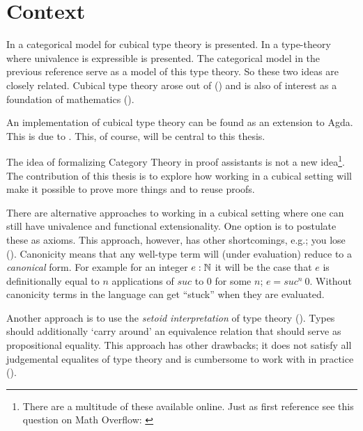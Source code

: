 \documentclass{article}
\begin{document}
\section{Context}
%
In \cite{bezem-2014} a categorical model for cubical type theory is presented.
In \cite{cohen-2016} a type-theory where univalence is expressible is presented.
The categorical model in the previous reference serve as a model of this type
theory. So these two ideas are closely related. Cubical type theory arose out of
 (\cite{hott-2013}) and is also of interest as a
foundation of mathematics (\cite{voevodsky-2011}).

An implementation of cubical type theory can be found as an extension to Agda.
This is due to \citeauthor{cubical-agda}. This, of course, will be central to
this thesis.

The idea of formalizing Category Theory in proof assistants is not a new
idea\footnote{There are a multitude of these available online. Just as first
reference see this question on Math Overflow: \cite{mo-formalizations}}. The
contribution of this thesis is to explore how working in a cubical setting will
make it possible to prove more things and to reuse proofs.

There are alternative approaches to working in a cubical setting where one can
still have univalence and functional extensionality. One option is to postulate
these as axioms. This approach, however, has other shortcomings, e.g.; you lose
 (\cite{huber-2016}). Canonicity means that any well-type
term will (under evaluation) reduce to a \emph{canonical} form. For example for
an integer $e : \mathbb{N}$ it will be the case that $e$ is definitionally equal to $n$
applications of $\mathit{suc}$ to $0$ for some $n$; $e = \mathit{suc}^n\ 0$.
Without canonicity terms in the language can get ``stuck'' when they are
evaluated.

Another approach is to use the \emph{setoid interpretation} of type theory
(\cite{hofmann-1995,huber-2016}). Types should additionally `carry around' an
equivalence relation that should serve as propositional equality. This approach
has other drawbacks; it does not satisfy all judgemental equalites of type
theory and is cumbersome to work with in practice (\cite[p. 4]{huber-2016}).
%
\end{document}
